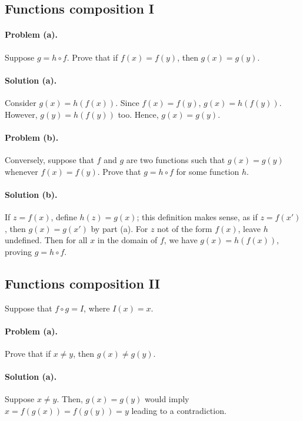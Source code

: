 \documentclass{article}
\begin{document}
\setcounter{subsection}{21}
\subsection{Functions composition I}

\paragraph{Problem (a).} Suppose $g = h \circ f$. Prove that if $f(x) = f(y)$,
then $g(x) = g(y)$.

\paragraph{Solution (a).} Consider $g(x) = h(f(x))$. Since $f(x) = f(y)$, $g(x)
= h(f(y))$. However, $g(y) = h(f(y))$ too. Hence, $g(x) = g(y)$.

\paragraph{Problem (b).} Conversely, suppose that $f$ and $g$ are two functions
such that $g(x) = g(y)$ whenever $f(x) = f(y)$. Prove that $g = h \circ f$ for
some function $h$.

\paragraph{Solution (b).} If $z = f(x)$, define $h(z) = g(x)$; this definition
makes sense, as if $z = f(x')$, then $g(x) = g(x')$ by part (a). For $z$ not of
the form $f(x)$, leave $h$ undefined. Then for all $x$ in the domain of $f$, we
have $g(x) = h(f(x))$, proving $g = h \circ f$.

\setcounter{subsection}{22}
\subsection{Functions composition II}

Suppose that $f \circ g = I$, where $I(x) = x$.

\paragraph{Problem (a).} Prove that if $x \neq y$, then $g(x) \neq g(y)$.

\paragraph{Solution (a).} Suppose $x \neq y$. Then, $g(x) = g(y)$ would imply
$x = f(g(x)) = f(g(y)) = y$ leading to a contradiction.
\end{document}

